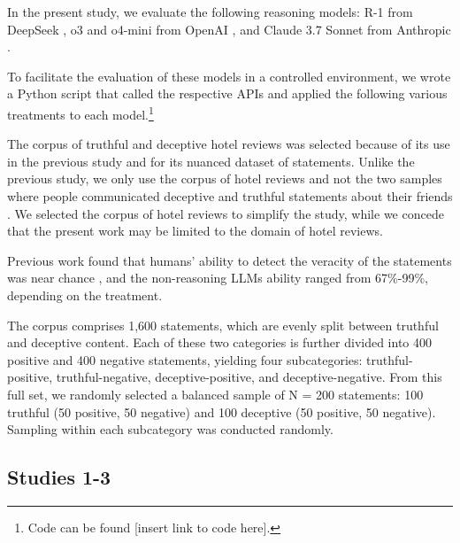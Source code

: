 \documentclass{article}
\begin{document}
In the present study, we evaluate the following reasoning models: R-1 from DeepSeek \citep{deepseek-ai_deepseek-r1_2025}, o3 and o4-mini from OpenAI \citep{openai_openai_2024}, and Claude 3.7 Sonnet from Anthropic \citep{anthropic_claude_2025}.

To facilitate the evaluation of these models in a controlled environment, we wrote a Python script that called the respective APIs and applied the following various treatments to each model.\footnote{Code can be found [insert link to code here].} %

The corpus of truthful and deceptive hotel reviews \citep{ott_finding_2011} was selected because of its use in the previous study \citep{markowitz_generative_2024} and for its nuanced dataset of statements. Unlike the previous study, we only use the corpus of hotel reviews \citep{ott_finding_2011} and not the two samples where people communicated deceptive and truthful statements about their friends \citep{markowitz_when_2020, lloyd_miami_2019}. We selected the corpus of hotel reviews to simplify the study, while we concede that the present work may be limited to the domain of hotel reviews.

Previous work \citep{markowitz_generative_2024} found that humans' ability to detect the veracity of the statements was near chance \citep{markowitz_generative_2024}, and the non-reasoning LLMs ability ranged from 67\%-99\%, depending on the treatment.

The corpus comprises 1,600 statements, which are evenly split between truthful and deceptive content. Each of these two categories is further divided into 400 positive and 400 negative statements, yielding four subcategories: truthful-positive, truthful-negative, deceptive-positive, and deceptive-negative. From this full set, we randomly selected a balanced sample of N = 200 statements: 100 truthful (50 positive, 50 negative) and 100 deceptive (50 positive, 50 negative). Sampling within each subcategory was conducted randomly.


\subsection{Studies 1-3}
\end{document}
